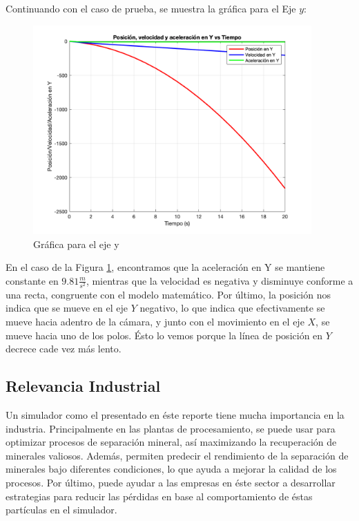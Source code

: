 \documentclass[12pt, letterpaper]{report}
\begin{document}
Continuando con el caso de prueba, se muestra la gráfica para el Eje $y$: 
\begin{figure}[H]
    \centering
    \includegraphics[height = 8cm]{2024-04-17_Grafica2_SeparacionMinerales.png}
    \caption{Gráfica para el eje y}
    \label{fig:fig3}
\end{figure} En el caso de la Figura \ref{fig:fig3}, encontramos que la aceleración en Y se mantiene constante en $9.81\frac{m}{s^2}$, mientras que la velocidad es negativa y disminuye conforme a una recta, congruente 
con el modelo matemático. Por último, la posición nos indica que se mueve en el eje $Y$ negativo, lo que indica que efectivamente se mueve hacia adentro de la cámara, 
y junto con el movimiento en el eje $X$, se mueve hacia uno de los polos. Ésto lo vemos porque la línea de posición en $Y$ decrece cade vez más lento. 

\subsection*{Relevancia Industrial}
Un simulador como el presentado en éste reporte tiene mucha importancia en la industria. Principalmente en las plantas de procesamiento, se puede usar 
para optimizar procesos de separación mineral, así maximizando la recuperación de minerales valiosos. Además, permiten predecir el rendimiento de la separación de minerales bajo 
diferentes condiciones, lo que ayuda a mejorar la calidad de los procesos. Por último, puede ayudar a las empresas en éste sector a 
desarrollar estrategias para reducir las pérdidas en base al comportamiento de éstas partículas en el simulador. 
\end{document}
